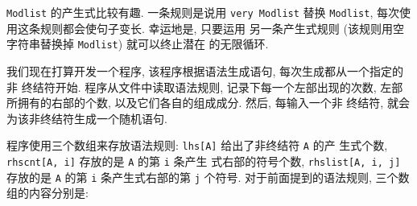 \texttt{Modlist} 的产生式比较有趣. 一条规则是说用 \texttt{very Modlist}
替换 \texttt{Modlist}, 每次使用这条规则都会使句子变长. 幸运地是, 只要运用
另一条产生式规则 (该规则用空字符串替换掉 \texttt{Modlist}) 就可以终止潜在
的无限循环.

我们现在打算开发一个程序, 该程序根据语法生成语句, 每次生成都从一个指定的非
终结符开始. 程序从文件中读取语法规则, 记录下每一个左部出现的次数,
左部所拥有的右部的个数, 以及它们各自的组成成分. 然后, 每输入一个非
终结符, 就会为该非终结符生成一个随机语句.

程序使用三个数组来存放语法规则:
\texttt{lhs[A]} 给出了非终结符 \texttt{A} 的产
生式个数, \texttt{rhscnt[A, i]} 存放的是 \texttt{A} 的第 \texttt{i} 条产生
式右部的符号个数, \texttt{rhslist[A, i, j]} 存放的是 \texttt{A} 的第
\texttt{i} 条产生式右部的第 \texttt{j} 个符号. 对于前面提到的语法规则,
三个数组的内容分别是:

